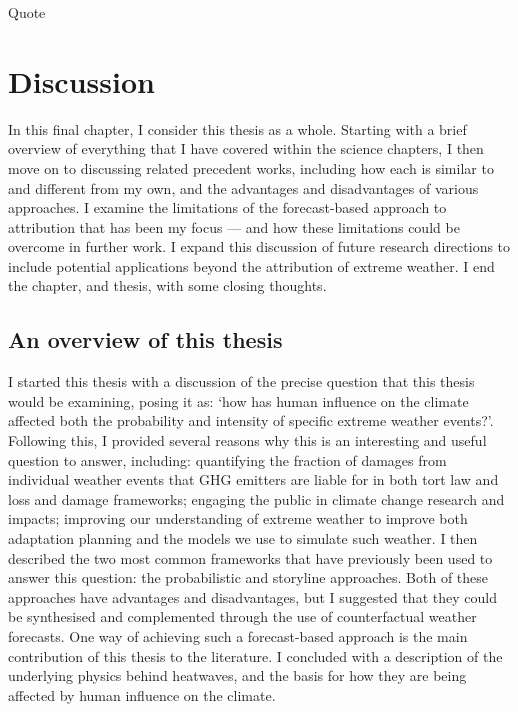 \begin{savequote}[8cm]
    Quote
\end{savequote}
    
\chapter{\label{discussion}Discussion} 

In this final chapter, I consider this thesis as a whole. Starting with a brief overview of everything that I have covered within the science chapters, I then move on to discussing related precedent works, including how each is similar to and different from my own, and the advantages and disadvantages of various approaches. I examine the limitations of the forecast-based approach to attribution that has been my focus --- and how these limitations could be overcome in further work. I expand this discussion of future research directions to include potential applications beyond the attribution of extreme weather. I end the chapter, and thesis, with some closing thoughts.

\minitoc

\clearpage

\section{An overview of this thesis}\label{discussion:overview}

  I started this thesis with a discussion of the precise question that this thesis would be examining, posing it as: `how has human influence on the climate affected both the probability and intensity of specific extreme weather events?'. Following this, I provided several reasons why this is an interesting and useful question to answer, including: quantifying the fraction of damages from individual weather events that GHG emitters are liable for in both tort law and loss and damage frameworks; engaging the public in climate change research and impacts; improving our understanding of extreme weather to improve both adaptation planning and the models we use to simulate such weather. I then described the two most common frameworks that have previously been used to answer this question: the probabilistic and storyline approaches. Both of these approaches have advantages and disadvantages, but I suggested that they could be synthesised and complemented through the use of counterfactual weather forecasts. One way of achieving such a forecast-based approach is the main contribution of this thesis to the literature. I concluded with a description of the underlying physics behind heatwaves, and the basis for how they are being affected by human influence on the climate.

